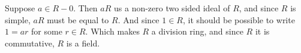 Suppose $a \in R - 0$. Then $aR$ us a non-zero two sided ideal of $R$, and since $R$ is simple, $aR$ must be equal to $R$. And since $1 \in R$, it should be possible to write $1=ar$ for some $r \in R$. Which makes $R$ a division ring, and since $R$ it is commutative, $R$ is a field.
